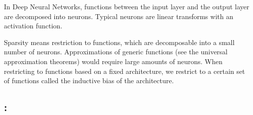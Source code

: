 In Deep Neural Networks, functions between the input layer and the output layer are decomposed into neurons.
Typical neurons are linear transforms with an activation function.

Sparsity means restriction to functions, which are decomposable into a small number of neurons.
Approximations of generic functions (see the universal approximation theorems) would require large amounts of neurons. %
When restricting to functions based on a fixed architecture, we restrict to a certain set of functions called the inductive bias of the architecture.

\subsection{: \partthreetext}